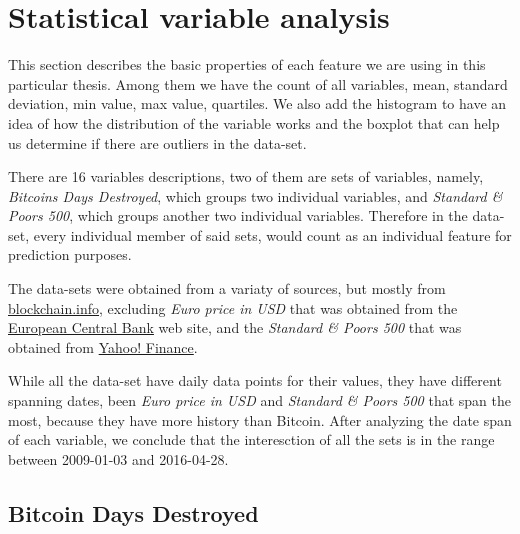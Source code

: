 



\chapter{Statistical variable analysis}
\label{ch:stat-var-analysis}

This section describes the basic properties of each feature we are
using in this particular thesis. Among them we have the count of all
variables, mean, standard deviation, min value, max value, quartiles.
We also add the histogram to have an idea of how the distribution of
the variable works and the boxplot that can help us determine if there
are outliers in the data-set.

There are 16 variables descriptions, two of them are sets of
variables, namely, \textit{Bitcoins Days Destroyed}, which groups two
individual variables, and \textit{Standard \& Poors 500}, which groups
another two individual variables. Therefore in the data-set, every
individual member of said sets, would count as an individual feature
for prediction purposes.

The data-sets were obtained from a variaty of sources, but mostly from
\href{https://blockchain.info/charts}{blockchain.info}, excluding
\textit{Euro price in USD} that was obtained from the
\href{https://www.ecb.europa.eu/stats/exchange/eurofxref/html/index.en.html}{European
  Central Bank} web site, and the \textit{Standard \& Poors 500} that
was obtained from
\href{https://finance.yahoo.com/q/hp?s=^GSPC\&a=00\&b=3\&c=1950\&d=05\&e=8\&f=2016\&g=d}{Yahoo!
  Finance}.

While all the data-set have daily data points for their values, they
have different spanning dates, been \textit{Euro price in USD} and
\textit{Standard \& Poors 500} that span the most, because they have
more history than Bitcoin. After analyzing the date span of each
variable, we conclude that the interesction of all the sets is in the
range between 2009-01-03 and 2016-04-28.

\section{Bitcoin Days Destroyed}
\label{sec:bitcoin-days-destroyed}

